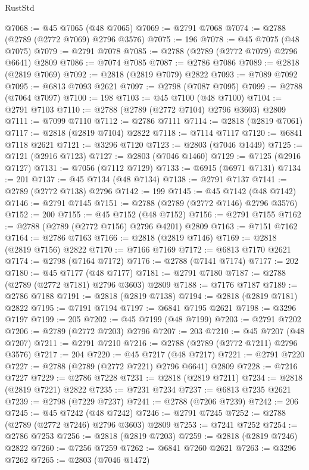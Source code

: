 \begin{lexlean}{RustStd}
\begin{coremodule}
@7068 := @45 @7065 (@48 @7065)
@7069 := @2791 @7068
@7074 := @2788 (@2789 (@2772 @7069) @2796 @3576)
@7075 := 196
@7078 := @45 @7075 (@48 @7075)
@7079 := @2791 @7078
@7085 := @2788 (@2789 (@2772 @7079) @2796 @6641) @2809
@7086 := @7074 @7085
@7087 := @2786 @7086
@7089 := @2818 (@2819 @7069)
@7092 := @2818 (@2819 @7079) @2822
@7093 := @7089 @7092
@7095 := @6813 @7093 @2621
@7097 := @2798 (@7087 @7095)
@7099 := @2788 (@7064 @7097)
@7100 := 198
@7103 := @45 @7100 (@48 @7100)
@7104 := @2791 @7103
@7110 := @2788 (@2789 (@2772 @7104) @2796 @3603) @2809
@7111 := @7099 @7110
@7112 := @2786 @7111
@7114 := @2818 (@2819 @7061)
@7117 := @2818 (@2819 @7104) @2822
@7118 := @7114 @7117
@7120 := @6841 @7118 @2621
@7121 := @3296 @7120
@7123 := @2803 (@7046 @1449)
@7125 := @7121 (@2916 @7123)
@7127 := @2803 (@7046 @1460)
@7129 := @7125 (@2916 @7127)
@7131 := @7056 (@7112 @7129)
@7133 := @6915 (@6971 @7131)
@7134 := 201
@7137 := @45 @7134 (@48 @7134)
@7138 := @2791 @7137
@7141 := @2789 (@2772 @7138) @2796
@7142 := 199
@7145 := @45 @7142 (@48 @7142)
@7146 := @2791 @7145
@7151 := @2788 (@2789 (@2772 @7146) @2796 @3576)
@7152 := 200
@7155 := @45 @7152 (@48 @7152)
@7156 := @2791 @7155
@7162 := @2788 (@2789 (@2772 @7156) @2796 @4201) @2809
@7163 := @7151 @7162
@7164 := @2786 @7163
@7166 := @2818 (@2819 @7146)
@7169 := @2818 (@2819 @7156) @2822
@7170 := @7166 @7169
@7172 := @6813 @7170 @2621
@7174 := @2798 (@7164 @7172)
@7176 := @2788 (@7141 @7174)
@7177 := 202
@7180 := @45 @7177 (@48 @7177)
@7181 := @2791 @7180
@7187 := @2788 (@2789 (@2772 @7181) @2796 @3603) @2809
@7188 := @7176 @7187
@7189 := @2786 @7188
@7191 := @2818 (@2819 @7138)
@7194 := @2818 (@2819 @7181) @2822
@7195 := @7191 @7194
@7197 := @6841 @7195 @2621
@7198 := @3296 @7197
@7199 := 205
@7202 := @45 @7199 (@48 @7199)
@7203 := @2791 @7202
@7206 := @2789 (@2772 @7203) @2796
@7207 := 203
@7210 := @45 @7207 (@48 @7207)
@7211 := @2791 @7210
@7216 := @2788 (@2789 (@2772 @7211) @2796 @3576)
@7217 := 204
@7220 := @45 @7217 (@48 @7217)
@7221 := @2791 @7220
@7227 := @2788 (@2789 (@2772 @7221) @2796 @6641) @2809
@7228 := @7216 @7227
@7229 := @2786 @7228
@7231 := @2818 (@2819 @7211)
@7234 := @2818 (@2819 @7221) @2822
@7235 := @7231 @7234
@7237 := @6813 @7235 @2621
@7239 := @2798 (@7229 @7237)
@7241 := @2788 (@7206 @7239)
@7242 := 206
@7245 := @45 @7242 (@48 @7242)
@7246 := @2791 @7245
@7252 := @2788 (@2789 (@2772 @7246) @2796 @3603) @2809
@7253 := @7241 @7252
@7254 := @2786 @7253
@7256 := @2818 (@2819 @7203)
@7259 := @2818 (@2819 @7246) @2822
@7260 := @7256 @7259
@7262 := @6841 @7260 @2621
@7263 := @3296 @7262
@7265 := @2803 (@7046 @1472)

\end{coremodule}
\end{lexlean}
